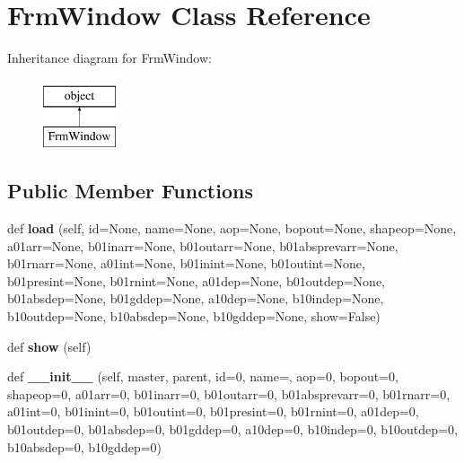 \hypertarget{class_f_window_1_1_frm_window}{}\section{Frm\+Window Class Reference}
\label{class_f_window_1_1_frm_window}
Inheritance diagram for Frm\+Window\+:\begin{figure}[H]
\begin{center}
\leavevmode
\includegraphics[height=2.000000cm]{class_f_window_1_1_frm_window}
\end{center}
\end{figure}
\subsection*{Public Member Functions}
\begin{DoxyCompactItemize}
\item 
\mbox{\label{class_f_window_1_1_frm_window_ae349def881aefeb65ebff931d052d0cd}} 
def {\bfseries load} (self, id=None, name=None, aop=None, bopout=None, shapeop=None, a01arr=None, b01inarr=None, b01outarr=None, b01absprevarr=None, b01rnarr=None, a01int=None, b01inint=None, b01outint=None, b01presint=None, b01rnint=None, a01dep=None, b01outdep=None, b01absdep=None, b01gddep=None, a10dep=None, b10indep=None, b10outdep=None, b10absdep=None, b10gddep=None, show=False)
\item 
\mbox{\label{class_f_window_1_1_frm_window_ab4f4398c3f210fe4ea6e720401357691}} 
def {\bfseries show} (self)
\item 
\mbox{\label{class_f_window_1_1_frm_window_a372b8cd7a25c46644ad20ca45547451c}} 
def {\bfseries \+\_\+\+\_\+init\+\_\+\+\_\+} (self, master, parent, id=0, name=\textquotesingle{}\textquotesingle{}, aop=0, bopout=0, shapeop=0, a01arr=0, b01inarr=0, b01outarr=0, b01absprevarr=0, b01rnarr=0, a01int=0, b01inint=0, b01outint=0, b01presint=0, b01rnint=0, a01dep=0, b01outdep=0, b01absdep=0, b01gddep=0, a10dep=0, b10indep=0, b10outdep=0, b10absdep=0, b10gddep=0)
\end{DoxyCompactItemize}
